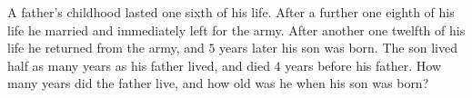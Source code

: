 A father's childhood lasted one sixth of his life. After a further one eighth of his life he married and immediately left for the army. After another one twelfth of his life he returned from the army, and $5$ years later his son was born. The son lived half as many years as his father lived, and died $4$ years before his father. How many years did the father live, and how old was he when his son was born?
